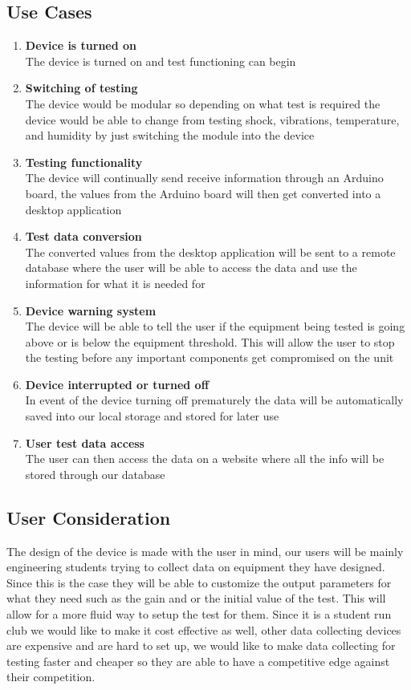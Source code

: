 \documentclass[12pt,titlepage]{article}
\begin{document}
\subsection{Use Cases} 
\begin{enumerate}
  
  \item \textbf{Device is turned on}\\ The device is turned on and test functioning can begin \item \textbf{Switching of testing}\\ The device would be modular so depending on what test is required the device would be able to change from testing shock, vibrations, temperature, and humidity by just switching the module into the device \item \textbf{Testing functionality}\\ The device will continually send receive information through an Arduino board, the values from the Arduino board will then get converted into a desktop application \item \textbf{Test data conversion}\\ The converted values from the desktop application will be sent to a remote database where the user will be able to access the data and use the information for what it is needed for \item \textbf{Device warning system}\\ The device will be able to tell the user if the equipment being tested is going above or is below the equipment threshold. This will allow the user to stop the testing before any important components get compromised on the unit \item \textbf{Device interrupted or turned off}\\ In event of the device turning off prematurely the data will be automatically saved into our local storage and stored for later use \item \textbf{User test data access}\\ The user can then access the data on a website where all the info will be stored through our database


  
\end{enumerate}

\subsection{User Consideration}
The design of the device is made with the user in mind, our users will be mainly engineering students trying to collect data on equipment they have designed. Since this is the case they will be able to customize the output parameters for what they need such as the gain and or the initial value of the test. This will allow for a more fluid way to setup the test for them. Since it is a student run club we would like to make it cost effective as well, other data collecting devices are expensive and are hard to set up, we would like to make data collecting for testing faster and cheaper so they are able to have a competitive edge against their competition.
\end{document}
